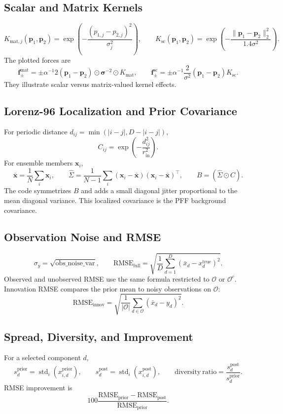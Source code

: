 \documentclass[11pt]{article}
\newcommand{\RMSE}{\mathrm{RMSE}}
\begin{document}
\subsection*{Scalar and Matrix Kernels}
\[
K_{\mathrm{mat},j}(\bm p_1,\bm p_2)
=\exp\left(-\frac{(p_{1,j}-p_{2,j})^2}{\sigma_j^2}\right),
\qquad
K_{\mathrm{sc}}(\bm p_1,\bm p_2)
=\exp\left(-\frac{\|\bm p_1-\bm p_2\|_2^2}{1.4\sigma^2}\right).
\]
The plotted forces are
\[
\bm f^{\mathrm{mat}}_{\pm}
=\pm\alpha^{-1}2(\bm p_1-\bm p_2)\odot\bm\sigma^{-2}\odot K_{\mathrm{mat}},
\qquad
\bm f^{\mathrm{sc}}_{\pm}
=\pm\alpha^{-1}\frac{2}{\sigma^2}(\bm p_1-\bm p_2)K_{\mathrm{sc}}.
\]
They illustrate scalar versus matrix-valued kernel effects.

\subsection*{Lorenz-96 Localization and Prior Covariance}
For periodic distance \(d_{ij}=\min(|i-j|,D-|i-j|)\),
\[
C_{ij}=\exp\left(-\frac{d_{ij}^2}{r_{\mathrm{in}}^2}\right).
\]
For ensemble members \(\bm x_i\),
\[
\bar{\bm x}=\frac{1}{N}\sum_i\bm x_i,\qquad
\hat\Sigma=\frac{1}{N-1}\sum_i(\bm x_i-\bar{\bm x})(\bm x_i-\bar{\bm x})^\top,\qquad
B=(\hat\Sigma\odot C).
\]
The code symmetrizes \(B\) and adds a small diagonal jitter proportional to the mean diagonal variance. This localized covariance is the PFF background covariance.

\subsection*{Observation Noise and RMSE}
\[
\sigma_y=\sqrt{\mathrm{obs\_noise\_var}},\qquad
\RMSE_{\mathrm{full}}=\sqrt{\frac{1}{D}\sum_{d=1}^D(\bar x_d-x_d^{\mathrm{true}})^2}.
\]
Observed and unobserved RMSE use the same formula restricted to \(\mathcal O\) or \(\mathcal O^c\). Innovation RMSE compares the prior mean to noisy observations on \(\mathcal O\):
\[
\RMSE_{\mathrm{innov}}=\sqrt{\frac{1}{|\mathcal O|}\sum_{d\in\mathcal O}(\bar x_d-y_d)^2}.
\]

\subsection*{Spread, Diversity, and Improvement}
For a selected component \(d\),
\[
s^{\mathrm{prior}}_d=\operatorname{std}_i(x^{\mathrm{prior}}_{i,d}),\qquad
s^{\mathrm{post}}_d=\operatorname{std}_i(x^{\mathrm{post}}_{i,d}),\qquad
\mathrm{diversity\ ratio}=\frac{s^{\mathrm{post}}_d}{s^{\mathrm{prior}}_d}.
\]
RMSE improvement is
\[
100\frac{\RMSE_{\mathrm{prior}}-\RMSE_{\mathrm{post}}}{\RMSE_{\mathrm{prior}}}.
\]
\end{document}
